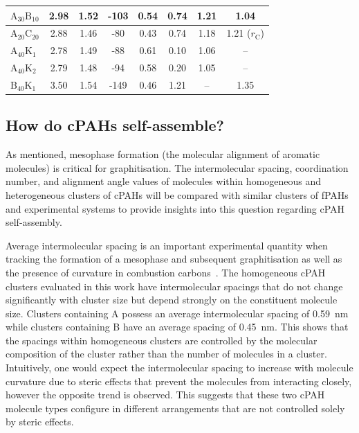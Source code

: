 \begin{table}[ht]
\begin{tabular}{lccccccc}
$\text{A}_{\text{30}}\text{B}_{\text{10}}$ & 2.98 & 1.52 & -103 & 0.54 & 0.74 & 1.21 & 1.04 \\ \hline
$\text{A}_{\text{20}}\text{C}_{\text{20}}$ & 2.88 & 1.46 & -80 & 0.43 & 0.74 & 1.18 & 1.21 ($r_{\text{C}}$) \\ \hline
$\text{A}_{\text{40}}\text{K}_{\text{1}}$ & 2.78 & 1.49 & -88 & 0.61 & 0.10 & 1.06 & -- \\
$\text{A}_{\text{40}}\text{K}_{\text{2}}$ & 2.79 & 1.48 & -94 & 0.58 & 0.20 & 1.05 & -- \\ 
$\text{B}_{\text{40}}\text{K}_{\text{1}}$ & 3.50 & 1.54 & -149 & 0.46 & 1.21 & -- & 1.35 \\ 
\end{tabular}
\end{table}
%

\subsection{How do cPAHs self-assemble?} 
As mentioned, mesophase formation (the molecular alignment of aromatic molecules) is critical for graphitisation. The intermolecular spacing, coordination number, and alignment angle values of molecules within homogeneous and heterogeneous clusters of cPAHs will be compared with similar clusters of fPAHs and experimental systems to provide insights into this question regarding cPAH self-assembly.

Average intermolecular spacing is an important experimental quantity when tracking the formation of a mesophase and subsequent graphitisation as well as the presence of curvature in combustion carbons~\cite{botero2019internal}. The homogeneous cPAH clusters evaluated in this work have intermolecular spacings that do not change significantly with cluster size but depend strongly on the constituent molecule size. Clusters containing A possess an average intermolecular spacing of 0.59~nm while clusters containing B have an average spacing of 0.45~nm.  This shows that the spacings within homogeneous clusters are controlled by the molecular composition of the cluster rather than the number of molecules in a cluster.  Intuitively, one would expect the intermolecular spacing to increase with molecule curvature due to steric effects that prevent the molecules from interacting closely, however the opposite trend is observed.  This suggests that these two cPAH molecule types configure in different arrangements that are not controlled solely by steric effects.

